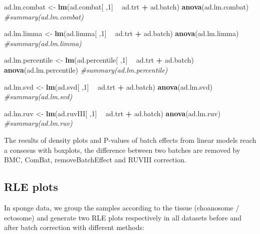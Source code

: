 \documentclass[]{book}
\newenvironment{Shaded}{\begin{snugshade}}{\end{snugshade}}
\newcommand{\KeywordTok}[1]{\textcolor[rgb]{0.13,0.29,0.53}{\textbf{#1}}}
\newcommand{\DecValTok}[1]{\textcolor[rgb]{0.00,0.00,0.81}{#1}}
\newcommand{\StringTok}[1]{\textcolor[rgb]{0.31,0.60,0.02}{#1}}
\newcommand{\CommentTok}[1]{\textcolor[rgb]{0.56,0.35,0.01}{\textit{#1}}}
\newcommand{\OperatorTok}[1]{\textcolor[rgb]{0.81,0.36,0.00}{\textbf{#1}}}
\newcommand{\NormalTok}[1]{#1}
\begin{document}
\begin{Shaded}
\begin{Highlighting}[]
\NormalTok{ad.lm.combat <-}\StringTok{ }\KeywordTok{lm}\NormalTok{(ad.combat[ ,}\DecValTok{1}\NormalTok{] }\OperatorTok{~}\StringTok{ }\NormalTok{ad.trt }\OperatorTok{+}\StringTok{ }\NormalTok{ad.batch)}
\KeywordTok{anova}\NormalTok{(ad.lm.combat)}
\CommentTok{#summary(ad.lm.combat)}

\NormalTok{ad.lm.limma <-}\StringTok{ }\KeywordTok{lm}\NormalTok{(ad.limma[ ,}\DecValTok{1}\NormalTok{] }\OperatorTok{~}\StringTok{ }\NormalTok{ad.trt }\OperatorTok{+}\StringTok{ }\NormalTok{ad.batch)}
\KeywordTok{anova}\NormalTok{(ad.lm.limma)}
\CommentTok{#summary(ad.lm.limma)}

\NormalTok{ad.lm.percentile <-}\StringTok{ }\KeywordTok{lm}\NormalTok{(ad.percentile[ ,}\DecValTok{1}\NormalTok{] }\OperatorTok{~}\StringTok{ }\NormalTok{ad.trt }\OperatorTok{+}\StringTok{ }\NormalTok{ad.batch)}
\KeywordTok{anova}\NormalTok{(ad.lm.percentile)}
\CommentTok{#summary(ad.lm.percentile)}

\NormalTok{ad.lm.svd <-}\StringTok{ }\KeywordTok{lm}\NormalTok{(ad.svd[ ,}\DecValTok{1}\NormalTok{] }\OperatorTok{~}\StringTok{ }\NormalTok{ad.trt }\OperatorTok{+}\StringTok{ }\NormalTok{ad.batch)}
\KeywordTok{anova}\NormalTok{(ad.lm.svd)}
\CommentTok{#summary(ad.lm.svd)}


\NormalTok{ad.lm.ruv <-}\StringTok{ }\KeywordTok{lm}\NormalTok{(ad.ruvIII[ ,}\DecValTok{1}\NormalTok{] }\OperatorTok{~}\StringTok{ }\NormalTok{ad.trt }\OperatorTok{+}\StringTok{ }\NormalTok{ad.batch)}
\KeywordTok{anova}\NormalTok{(ad.lm.ruv)}
\CommentTok{#summary(ad.lm.ruv)}
\end{Highlighting}
\end{Shaded}

The results of density plots and P-values of batch effects from linear
models reach a consesus with boxplots, the difference between two
batches are removed by BMC, ComBat, removeBatchEffect and RUVIII
correction.

\subsection{RLE plots}\label{rle-plots-1}

In sponge data, we group the samples according to the tissue (choanosome
/ ectosome) and generate two RLE plots respectively in all datasets
before and after batch correction with different methods:
\end{document}
